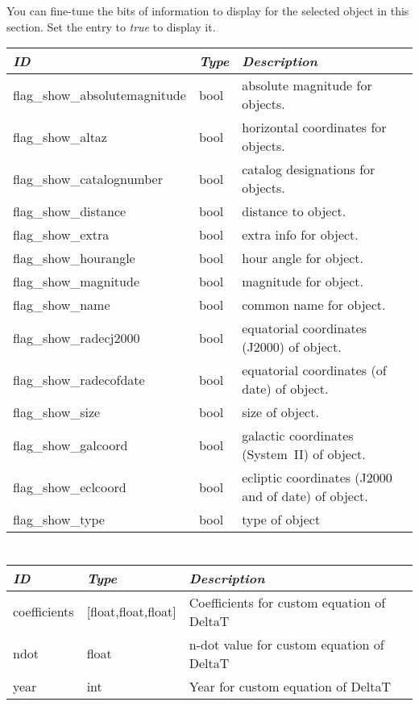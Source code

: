 \section{}
\label{sec:config.ini:custom_selected_info}

You can fine-tune the bits of information to display for the selected object in this section. Set the entry to \emph{true} to display it.

\begin{longtabu} to \textwidth {l|l|X}
\toprule
\emph{ID} & \emph{Type} & \emph{Description}\tabularnewline
\midrule
flag\_show\_absolutemagnitude & bool & absolute magnitude for objects.\tabularnewline
\midrule
flag\_show\_altaz & bool & horizontal coordinates for objects.\tabularnewline
\midrule
flag\_show\_catalognumber & bool & catalog designations for objects.\tabularnewline
\midrule
flag\_show\_distance & bool & distance to object.\tabularnewline
\midrule
flag\_show\_extra & bool & extra info for object.\tabularnewline
\midrule
flag\_show\_hourangle & bool & hour angle for object.\tabularnewline
\midrule
flag\_show\_magnitude & bool & magnitude for object.\tabularnewline
\midrule
flag\_show\_name & bool & common name for object.\tabularnewline
\midrule
flag\_show\_radecj2000 & bool & equatorial coordinates (J2000) of object.\tabularnewline
\midrule
flag\_show\_radecofdate & bool & equatorial coordinates (of date) of object.\tabularnewline
\midrule
flag\_show\_size & bool & size of object.\tabularnewline
\midrule
flag\_show\_galcoord & bool & galactic coordinates (System~II) of object.\tabularnewline
\midrule
flag\_show\_eclcoord & bool & ecliptic coordinates (J2000 and of date) of object.\tabularnewline
\midrule
flag\_show\_type & bool & type of object\tabularnewline
\bottomrule
\end{longtabu}


\section{}
\label{sec:config.ini:custom_time_correction}

\begin{longtabu} to \textwidth {l|l|X}
\toprule
\emph{ID} & \emph{Type} & \emph{Description}\tabularnewline
\midrule
coefficients & {[}float,float,float{]} & Coefficients for
custom equation of DeltaT\tabularnewline
\midrule
ndot & float & n-dot value for custom equation of
DeltaT\tabularnewline
\midrule
year & int & Year for custom equation of DeltaT\tabularnewline
\bottomrule
\end{longtabu}

